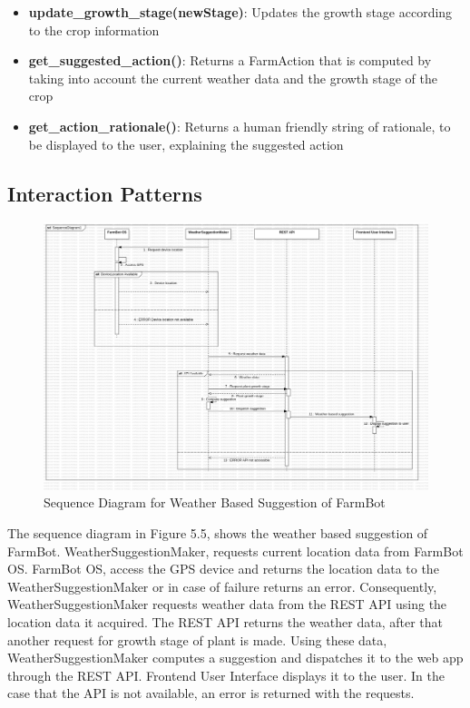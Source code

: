 \begin{itemize}
\begin{itemize}
        \item \textbf{update\_growth\_stage(newStage)}: Updates the growth stage according to the crop information
        \item \textbf{get\_suggested\_action()}: Returns a FarmAction that is computed by taking into account the current weather data and the growth stage of the crop
        \item \textbf{get\_action\_rationale()}: Returns a human friendly string of rationale, to be displayed to the user, explaining the suggested action
    \end{itemize}
\end{itemize}

\subsection{Interaction Patterns}

\begin{figure}[H]
    \centering
    \includegraphics[width=1\textwidth]{Figures/SequenceDiagramSuggestions.png}
    \caption{Sequence Diagram for Weather Based Suggestion of FarmBot}\label{fig:sequence_diagram_suggestions}
\end{figure}

The sequence diagram in Figure 5.5, shows the weather based suggestion of FarmBot. WeatherSuggestionMaker, requests current location data from FarmBot OS. FarmBot OS, access the GPS device and returns the location data to the WeatherSuggestionMaker or in case of failure returns an error. Consequently, WeatherSuggestionMaker requests weather data from the REST API using the location data it acquired. The REST API returns the weather data, after that another request for growth stage of plant is made. Using these data, WeatherSuggestionMaker computes a suggestion and dispatches it to the web app through the REST API. Frontend User Interface displays it to the user. In the case that the API is not available, an error is returned with the requests.

